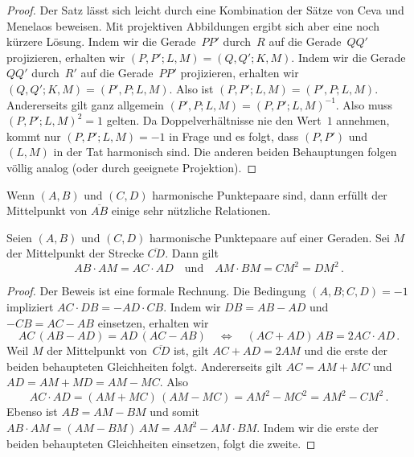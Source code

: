 \begin{proof}
	Der Satz lässt sich leicht durch eine Kombination der Sätze von Ceva und Menelaos beweisen. Mit projektiven Abbildungen ergibt sich aber eine noch kürzere Lösung. Indem wir die Gerade~$PP'$ durch~$R$ auf die Gerade~$QQ'$ projizieren, erhalten wir $(P,P';L,M)=(Q,Q';K,M)$. Indem wir die Gerade~$QQ'$ durch~$R'$ auf die Gerade~$PP'$ projizieren, erhalten wir $(Q,Q';K,M)=(P',P;L,M)$. Also ist $(P,P';L,M)=(P',P;L,M)$. Andererseits gilt ganz allgemein $(P',P;L,M)=(P,P';L,M)^{-1}$. Also muss $(P,P';L,M)^2=1$ gelten. Da Doppelverhältnisse nie den Wert~$1$ annehmen, kommt nur $(P,P';L,M)=-1$ in Frage und es folgt, dass $(P,P')$ und $(L,M)$ in der Tat harmonisch sind. Die anderen beiden Behauptungen folgen völlig analog (oder durch geeignete Projektion).
\end{proof}

Wenn $(A,B)$ und $(C,D)$ harmonische Punktepaare sind, dann erfüllt der Mittelpunkt von $\overline{AB}$ einige sehr nützliche Relationen.

\begin{satzmitnamen}[Lemma]
	Seien $(A,B)$ und $(C,D)$ harmonische Punktepaare auf einer Geraden. Sei $M$ der Mittelpunkt der Strecke $\overline{CD}$. Dann gilt 
	\begin{equation*}
		AB\cdot AM=AC\cdot AD\quad\text{und}\quad AM\cdot BM=CM^2=DM^2\,.
	\end{equation*}
\end{satzmitnamen}

\begin{proof}
	Der Beweis ist eine formale Rechnung. Die Bedingung $(A,B;C,D)=-1$ impliziert $AC\cdot DB=-AD\cdot CB$. Indem wir $DB=AB-AD$ und $-CB=AC-AB$ einsetzen, erhalten wir
	\begin{equation*}
		AC\,(AB-AD)=AD\,(AC-AB)\quad\iff\quad (AC+AD)\,AB=2AC\cdot AD\,.
	\end{equation*}
	Weil $M$ der Mittelpunkt von~$\overline{CD}$ ist, gilt $AC+AD=2AM$ und die erste der beiden behaupteten Gleichheiten folgt. Andererseits gilt $AC=AM+MC$ und $AD=AM+MD=AM-MC$. Also
	\begin{equation*}
		AC\cdot AD=(AM+MC)\,(AM-MC)=AM^2-MC^2=AM^2-CM^2\,.
	\end{equation*}
	Ebenso ist $AB=AM-BM$ und somit $AB\cdot AM=(AM-BM)\,AM=AM^2-AM\cdot BM$. Indem wir die erste der beiden behaupteten Gleichheiten einsetzen, folgt die zweite.
\end{proof}

